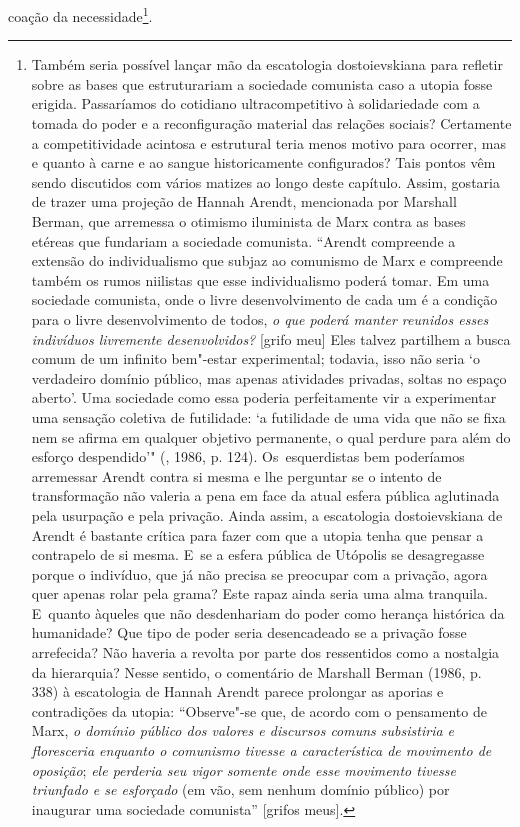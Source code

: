 coação da necessidade\footnote{Também seria possível lançar mão da
  escatologia dostoievskiana para refletir sobre as bases que
  estruturariam a sociedade comunista caso a utopia fosse erigida.
  Passaríamos do cotidiano ultracompetitivo à solidariedade com a tomada
  do poder e a reconfiguração material das relações sociais? Certamente
  a competitividade acintosa e estrutural teria menos motivo para
  ocorrer, mas e quanto à carne e ao sangue historicamente configurados?
  Tais pontos vêm sendo discutidos com vários matizes ao longo deste
  capítulo. Assim, gostaria de trazer uma projeção de Hannah Arendt,
  mencionada por Marshall Berman, que arremessa o otimismo iluminista de
  Marx contra as bases etéreas que fundariam a sociedade comunista.
  ``Arendt compreende a extensão do individualismo que subjaz ao
  comunismo de Marx e compreende também os rumos niilistas que esse
  individualismo poderá tomar. Em uma sociedade comunista, onde o livre
  desenvolvimento de cada um é a condição para o livre desenvolvimento
  de todos, \emph{o que poderá manter reunidos esses indivíduos
  livremente desenvolvidos?} {[}grifo meu{]} Eles talvez partilhem a
  busca comum de um infinito bem"-estar experimental; todavia, isso não
  seria `o verdadeiro domínio público, mas apenas atividades privadas,
  soltas no espaço aberto'. Uma sociedade como essa poderia
  perfeitamente vir a experimentar uma sensação coletiva de futilidade:
  `a futilidade de uma vida que não se fixa nem se afirma em qualquer
  objetivo permanente, o qual perdure para além do esforço despendido'"
  (, 1986, p. 124). Os~esquerdistas bem poderíamos arremessar
  Arendt contra si mesma e lhe perguntar se o intento de transformação
  não valeria a pena em face da atual esfera pública aglutinada pela
  usurpação e pela privação. Ainda assim, a escatologia dostoievskiana
  de Arendt é bastante crítica para fazer com que a utopia tenha que
  pensar a contrapelo de si mesma. E~se a esfera pública de Utópolis se
  desagregasse porque o indivíduo, que já não precisa se preocupar com a
  privação, agora quer apenas rolar pela grama? Este rapaz ainda seria
  uma alma tranquila. E~quanto àqueles que não desdenhariam do poder
  como herança histórica da humanidade? Que tipo de poder seria
  desencadeado se a privação fosse arrefecida? Não haveria a revolta por
  parte dos ressentidos como a nostalgia da hierarquia? Nesse sentido, o
  comentário de Marshall Berman (1986, p. 338) à escatologia de Hannah
  Arendt parece prolongar as aporias e contradições da utopia:
  ``Observe"-se que, de acordo com o pensamento de Marx, \emph{o domínio
  público dos valores e discursos comuns subsistiria e floresceria
  enquanto o comunismo tivesse a característica de movimento de
  oposição}; \emph{ele perderia seu vigor somente onde esse movimento
  tivesse triunfado e se esforçado} (em vão, sem nenhum domínio público)
  por inaugurar uma sociedade comunista'' {[}grifos meus{]}.}.

